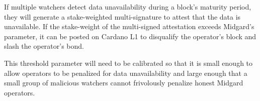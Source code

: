 \documentclass[../midgard.tex]{subfiles}
\begin{document}
If multiple watchers detect data unavailability during a block's maturity period, they will generate a stake-weighted multi-signature to attest that the data is unavailable.
If the stake-weight of the multi-signed attestation exceeds Midgard's  parameter, it can be posted on Cardano L1 to disqualify the operator's block and slash the operator's bond.

This threshold parameter will need to be calibrated so that it is small enough to allow operators to be penalized for data unavailability and large enough that a small group of malicious watchers cannot frivolously penalize honest Midgard operators.
\end{document}
